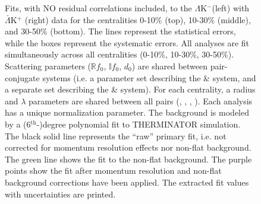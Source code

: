 \documentclass[/home/jesse/Analysis/FemtoAnalysis/AnalysisNotes/AnalysisNoteJBuxton.tex]{subfiles}
\renewcommand{\NonFlatBgdLamKch}{_NonFlatBgdCrctnPolynomial}
\renewcommand{\NonFlatBgdLamKs}{_NonFlatBgdCrctnLinear}
\renewcommand{\ResNum}{_NoRes}
\renewcommand{\SaveNameModLamKch}{\MomRes\NonFlatBgdLamKch\ResNum\ParamFixAndShareLamKch}
\renewcommand{\SaveNameModLamKs}{\MomRes\NonFlatBgdLamKs\ResNum\ParamFixAndShareLamKs}
\begin{document}
\begin{landscape}
\begin{figure}[h]
  \centering
  \caption[$\Lambda$K$^{-}$($\bar{\Lambda}$K$^{+}$) Fits with No Residuals]{Fits, with NO residual correlations included, to the $\Lambda$K$^{-}$(left) with $\bar{\Lambda}$K$^{+}$ (right) data for the centralities 0-10\% (top), 10-30\% (middle), and 30-50\% (bottom).
 The lines represent the statistical errors, while the boxes represent the systematic errors.  
 All \LamKpm analyses are fit simultaneously across all centralities (0-10\%, 10-30\%, 30-50\%).
 Scattering parameters ($\mathbb{R}f_{0}$, $\mathbb{I}f_{0}$, $d_{0}$) are shared between pair-conjugate systems (i.e. a parameter set describing the \LamKchP \& \ALamKchM system, and a separate set describing the \LamKchM \& \ALamKchP system).
 For each centrality, a radius and $\lambda$ parameters are shared between all pairs (\LamKchP, \ALamKchM, \LamKchM, \ALamKchP).
 Each analysis has a unique normalization parameter.
 The background is modeled by a (6$^{\mathrm{th}}$-)degree polynomial fit to THERMINATOR simulation.
 The black solid line represents the ``raw'' primary fit, i.e. not corrected for momentum resolution effects nor non-flat background.  
 The green line shows the fit to the non-flat background.
 The purple points show the fit after momentum resolution and non-flat background corrections have been applied.
 The extracted fit values with uncertainties are printed.}
  \label{fig:LamKchMwConjFits_NoRes}
\end{figure}

\end{landscape}
\pagestyle{plain}




\pagestyle{empty}
\begin{landscape}




\end{landscape}
\pagestyle{plain} 



\clearpage
\end{document}
